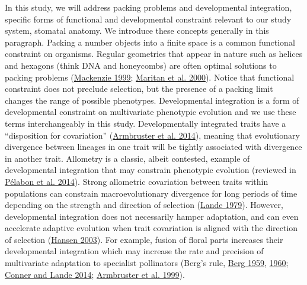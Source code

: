 \documentclass[
  12pt,
]{article}
\begin{document}
In this study, we will address packing problems and developmental integration, specific forms of functional and developmental constraint relevant to our study system, stomatal anatomy. We introduce these concepts generally in this paragraph. Packing a number objects into a finite space is a common functional constraint on organisms. Regular geometries that appear in nature such as helices and hexagons (think DNA and honeycombs) are often optimal solutions to packing problems (\protect\hyperlink{ref-mackenzie_proving_1999}{Mackenzie 1999}; \protect\hyperlink{ref-maritan_optimal_2000}{Maritan et al. 2000}). Notice that functional constraint does not preclude selection, but the presence of a packing limit changes the range of possible phenotypes. Developmental integration is a form of developmental constraint on multivariate phenotypic evolution and we use these terms interchangeably in this study. Developmentally integrated traits have a ``disposition for covariation'' (\protect\hyperlink{ref-armbruster_integrated_2014}{Armbruster et al. 2014}), meaning that evolutionary divergence between lineages in one trait will be tightly associated with divergence in another trait. Allometry is a classic, albeit contested, example of developmental integration that may constrain phenotypic evolution (reviewed in \protect\hyperlink{ref-pelabon_evolution_2014}{Pélabon et al. 2014}). Strong allometric covariation between traits within populations can constrain macroevolutionary divergence for long periods of time depending on the strength and direction of selection (\protect\hyperlink{ref-lande_quantitative_1979}{Lande 1979}). However, developmental integration does not necessarily hamper adaptation, and can even accelerate adaptive evolution when trait covariation is aligned with the direction of selection (\protect\hyperlink{ref-hansen_is_2003}{Hansen 2003}). For example, fusion of floral parts increases their developmental integration which may increase the rate and precision of multivariate adaptation to specialist pollinators (Berg's rule, \protect\hyperlink{ref-berg_general_1959}{Berg 1959}, \protect\hyperlink{ref-berg_ecological_1960}{1960}; \protect\hyperlink{ref-conner_raissa_2014}{Conner and Lande 2014}; \protect\hyperlink{ref-armbruster_covariance_1999}{Armbruster et al. 1999}).
\end{document}
